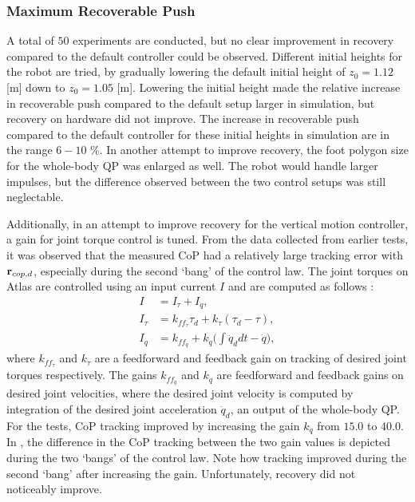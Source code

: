 \subsubsection{Maximum Recoverable Push}
A total of $50$ experiments are conducted, but no clear improvement in recovery compared to the default controller could be observed. Different initial heights for the robot are tried, by gradually lowering the default initial height of $z_0=1.12$ [m] down to $z_0=1.05$ [m]. Lowering the initial height made the relative increase in recoverable push compared to the default setup larger in simulation, but recovery on hardware did not improve. The increase in recoverable push compared to the default controller for these initial heights in simulation are in the range $6-10$ \%. In another attempt to improve recovery, the foot polygon size for the whole-body \ac{QP} was enlarged as well. The robot would handle larger impulses, but the difference observed between the two control setups was still neglectable.

Additionally, in an attempt to improve recovery for the vertical motion controller, a gain for joint torque control is tuned. From the data collected from earlier tests, it was observed that the measured \ac{CoP} had a relatively large tracking error with $\mathbf{r}_{cop,d}$, especially during the second `bang' of the control law. The joint torques on Atlas are controlled using an input current $I$ and are computed as follows \cite{koolen2016design}:
\begin{align}
	I &= I_{\tau} + I_{\dot{q}},\\
	I_{\tau} &= k_{ff_{\tau}}\tau_{d} + k_{\tau}(\tau_{d} - \tau),\\
	I_{\dot{q}} &= k_{ff_{\dot{q}}} + k_{\dot{q}}\bigg(\int \ddot{q}_d dt - \dot{q} \bigg),
\end{align}
where $k_{ff_{\tau}}$ and $k_{\tau}$ are a feedforward and feedback gain on tracking of desired joint torques respectively. The gains $k_{ff_{\dot{q}}}$ and $k_{\dot{q}}$ are feedforward and feedback gains on desired joint velocities, where the desired joint velocity is computed by integration of the desired joint acceleration $\ddot{q}_d$, an output of the whole-body \ac{QP}. For the tests, \ac{CoP} tracking improved by increasing the gain $k_{\dot{q}}$ from $15.0$ to $40.0$. In , the difference in the \ac{CoP} tracking between the two gain values is depicted during the two `bangs' of the control law. Note how tracking improved during the second `bang' after increasing the gain. Unfortunately, recovery did not noticeably improve.

